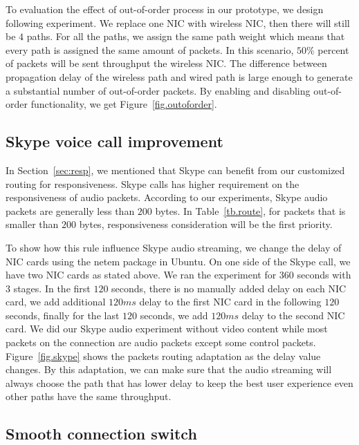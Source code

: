 To evaluation the effect of out-of-order process in our prototype, we design following experiment. We replace one NIC with wireless NIC, then there will still be $4$ paths. For all the paths, we assign the same path weight which means that every path is assigned the same amount of packets. In this scenario, $50\%$ percent of packets will be sent throughput the wireless NIC. The difference between propagation delay of the wireless path and wired path is large enough to generate a substantial number of out-of-order packets. By enabling and disabling out-of-order functionality, we get Figure~\ref{fig.outoforder}.


\subsection{Skype voice call improvement}
\label{sec:skype}

In Section~\ref{sec:resp}, we mentioned that Skype can benefit from our customized routing for responsiveness. Skype calls has higher requirement on the responsiveness of audio packets. According to our experiments, Skype audio packets are generally less than $200$ bytes. In Table~\ref{tb.route}, for packets that is smaller than $200$ bytes, responsiveness consideration will be the first priority. 

To show how this rule influence Skype audio streaming, we change the delay of NIC cards using the netem package in Ubuntu. On one side of the Skype call, we have two NIC cards as stated above. We ran the experiment for $360$ seconds with $3$ stages. In the first $120$ seconds, there is no manually added delay on each NIC card, we add additional $120ms$ delay to the first NIC card in the following $120$ seconds, finally for the last $120$ seconds, we add $120ms$ delay to the second NIC card. We did our Skype audio experiment without video content while most packets on the connection are audio packets except some control packets. Figure~\ref{fig.skype} shows the packets routing adaptation as the delay value changes. By this adaptation, we can make sure that the audio streaming will always choose the path that has lower delay to keep the best user experience even other paths have the same throughput.


\subsection{Smooth connection switch}
\label{sec:switch}

